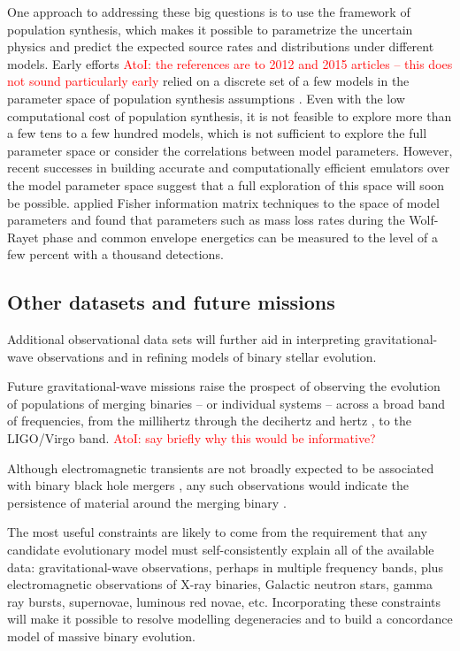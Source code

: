\documentclass[iop,onecolumn]{revtex4}
\newcommand{\todo}[1]{\textcolor{red}{#1}}
\newcommand{\ajf}[1]{\textcolor{red}{AtoI: #1}}
\begin{document}
One approach to addressing these big questions is to use the framework of population synthesis, which makes it possible to parametrize the uncertain physics and predict the expected source rates and distributions under different models.  Early efforts \ajf{the references are to 2012 and 2015 articles -- this does not sound particularly early} relied on a discrete set of a few models in the parameter space of population synthesis assumptions \citep{Dominik:2012,Stevenson:2015}.  Even with the low computational cost of population synthesis, it is not feasible to explore more than a few tens to a few hundred models, which is not sufficient to explore the full parameter space or consider the correlations between model parameters.  However, recent successes in building accurate and computationally efficient emulators over the model parameter space \citep{Barrett:2017} suggest that a full exploration of this space will soon be possible. \citet{Barrett:2017FIM} applied Fisher information matrix techniques to the space of model parameters and found that parameters such as mass loss rates during the Wolf-Rayet phase and common envelope energetics can be measured to the level of a few percent with a thousand detections. 

\subsection{Other datasets and future missions}
Additional observational data sets will further aid in interpreting gravitational-wave observations and in refining models of binary stellar evolution.

Future gravitational-wave missions raise the prospect of observing the evolution of populations of merging binaries -- or individual systems -- across a broad band of frequencies, from the millihertz \citep[e.g.,][]{Sesana:2016} through the decihertz \citep{Mandel:2017} and hertz \citep{ET:2012}, to the LIGO/Virgo band.  \ajf{say briefly why this would be informative?}

Although electromagnetic transients are not broadly expected to be associated with binary black hole mergers \citep[e.g.,][]{Lyutikov:2016}, any such observations would indicate the persistence of material around the merging binary \citep[e.g.,][]{deMinkKing:2017}.  %

The most useful constraints are likely to come from the requirement that any candidate evolutionary model must self-consistently explain all of the available data: gravitational-wave observations, perhaps in multiple frequency bands, plus electromagnetic observations of X-ray binaries, Galactic neutron stars, gamma ray bursts, supernovae, luminous red novae, etc. Incorporating these constraints will make it possible to resolve modelling degeneracies and to build a concordance model of massive binary evolution.  %
\end{document}
